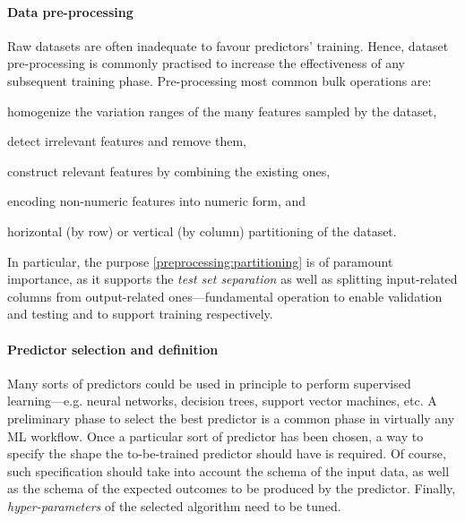 \documentclass{article}
\begin{document}
\paragraph{Data pre-processing}
%
Raw datasets are often inadequate to favour predictors' training.
%
Hence, dataset pre-processing is commonly practised to increase the effectiveness of any subsequent training phase.
%
Pre-processing most common bulk operations are:
%
\begin{inlinelist}
    \item homogenize the variation ranges of the many features sampled by the dataset,
    \item detect irrelevant features and remove them,
    \item construct relevant features by combining the existing ones,
    \item encoding non-numeric features into numeric form, and
    \item\label{preprocessing:partitioning} horizontal (by row) or vertical (by column) partitioning of the dataset.
\end{inlinelist}
%
In particular, the purpose \ref{preprocessing:partitioning} is of paramount importance, as it supports the \emph{test set separation} as well as splitting input-related columns from output-related ones---fundamental operation to enable validation and testing and to support training respectively.

\paragraph{Predictor selection and definition}
%
Many sorts of predictors could be used in principle to perform supervised learning---e.g. neural networks, decision trees, support vector machines, etc.
%
A preliminary phase to select the best predictor is a common phase in virtually any ML workflow.
%
Once a particular sort of predictor has been chosen, a way to specify the shape the to-be-trained predictor should have is required.
%
Of course, such specification should take into account the schema of the input data, as well as the schema of the expected outcomes to be produced by the predictor.
%
Finally, \emph{hyper-parameters} of the selected algorithm need to be tuned.
%
\end{document}
